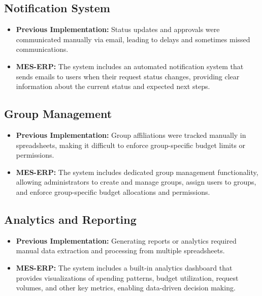 \documentclass[12pt, titlepage]{article}
\begin{document}
\subsection{Notification System}

\begin{itemize}
    \item \textbf{Previous Implementation:} Status updates and approvals were communicated manually via email, leading to delays and sometimes missed communications.
    
    \item \textbf{MES-ERP:} The system includes an automated notification system that sends emails to users when their request status changes, providing clear information about the current status and expected next steps.
\end{itemize}

\subsection{Group Management}

\begin{itemize}
    \item \textbf{Previous Implementation:} Group affiliations were tracked manually in spreadsheets, making it difficult to enforce group-specific budget limits or permissions.
    
    \item \textbf{MES-ERP:} The system includes dedicated group management functionality, allowing administrators to create and manage groups, assign users to groups, and enforce group-specific budget allocations and permissions.
\end{itemize}

\subsection{Analytics and Reporting}

\begin{itemize}
    \item \textbf{Previous Implementation:} Generating reports or analytics required manual data extraction and processing from multiple spreadsheets.
    
    \item \textbf{MES-ERP:} The system includes a built-in analytics dashboard that provides visualizations of spending patterns, budget utilization, request volumes, and other key metrics, enabling data-driven decision making.
\end{itemize}
\end{document}
